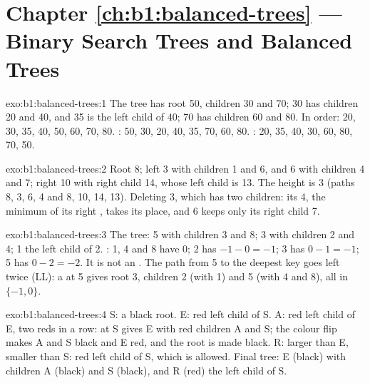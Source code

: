 \section*{Chapter \ref{ch:b1:balanced-trees} --- Binary Search Trees and Balanced Trees}

\begin{solution}{exo:b1:balanced-trees:1}
The tree has root 50, children 30 and 70; 30 has children 20 and 40, and 35 is the left child of 40; 70 has children 60
and 80. In order: 20, 30, 35, 40, 50, 60, 70, 80. : 50, 30, 20, 40, 35, 70, 60, 80. : 20, 35, 40, 30,
60, 80, 70, 50.
\end{solution}

\begin{solution}{exo:b1:balanced-trees:2}
Root 8; left 3 with children 1 and 6, and 6 with children 4 and 7; right 10 with right child 14, whose left child is 13.
The height is 3 (paths 8, 3, 6, 4 and 8, 10, 14, 13). Deleting 3, which has two children: its  4, the minimum
of its right , takes its place, and 6 keeps only its right child 7.
\end{solution}

\begin{solution}{exo:b1:balanced-trees:3}
The tree: 5 with children 3 and 8; 3 with children 2 and 4; 1 the left child of 2. : 1, 4 and 8 have 0;
2 has $-1 - 0 = -1$; 3 has $0 - 1 = -1$; 5 has $0 - 2 = -2$. It is not an . The path from 5 to the deepest key
goes left twice (LL): a  at 5 gives root 3, children 2 (with 1) and 5 (with 4 and 8), all 
in $\{-1, 0\}$.
\end{solution}

\begin{solution}{exo:b1:balanced-trees:4}
S: a black root. E: red left child of S. A: red left child of E, two reds in a row:  at S gives E with red
children A and S; the colour flip makes A and S black and E red, and the root is made black. R: larger than E, smaller
than S: red left child of S, which is allowed. Final tree: E (black) with children A (black) and S (black), and R (red)
the left child of S.
\end{solution}

